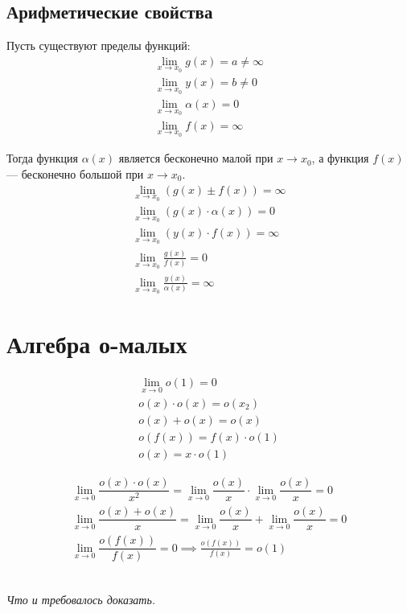 \documentclass[a4paper,12pt,oneside]{extbook}
\newcommand{\newpar}{$ $\par\nobreak\ignorespaces}
\theoremstyle{numbered}
\theoremstyle{unnumbered}
\theoremstyle{named}
\theoremstyle{unnumbered}
\theoremstyle{named}
\theoremstyle{named}
\theoremstyle{named}
\renewenvironment{proof}[1][]{\breakenv[Доказательство]{\if\relax\detokenize{#1}\relax\else\;\fi}{\textbf{#1}}}{\smallskip\newpar \hfill\textit{Что и требовалось доказать.}}
\begin{document}
\subsection{Арифметические свойства}%
\label{sub:Арифметические свойства}

Пусть существуют пределы функций:
\begin{gather*}
    \lim_{x \to x_0}{g(x)} = a \neq \infty \\
    \lim_{x \to x_0}{y(x)} = b \neq 0 \\
    \lim_{x \to x_0}{\alpha(x)} = 0 \\
    \lim_{x \to x_0}{f(x)} = \infty
\end{gather*}

Тогда функция \(\alpha(x)\) является бесконечно малой при \(x \to x_0\), а функция \(f(x)\) — бесконечно большой при \(x \to x_0\).
\begin{gather*}
    \lim_{x \to x_0}{(g(x) \pm f(x))} = \infty \\
    \lim_{x \to x_0}{(g(x) \cdot \alpha(x))} = 0 \\
    \lim_{x \to x_0}{(y(x) \cdot f(x))} = \infty \\
    \lim_{x \to x_0}{\frac{g(x)}{f(x)}} = 0 \\
    \lim_{x \to x_0}{\frac{y(x)}{\alpha(x)}} = \infty
\end{gather*}

\section{Алгебра о-малых}%
\label{sec:Алгебра о-малых}

\begin{gather*}
    \lim_{x \to 0}{o(1)} = 0 \\
    o(x) \cdot o(x) = o(x_2) \\
    o(x) + o(x) = o(x) \\
    o(f(x)) = f(x) \cdot o(1) \\
    o(x) = x \cdot o(1)
\end{gather*}

\begin{proof}
    \begin{gather*}
        \lim_{x \to 0}{\dfrac{o(x) \cdot o(x)}{x^2}} = \lim_{x \to 0}{\dfrac{o(x)}{x}} \cdot \lim_{x \to 0}{\dfrac{o(x)}{x}} = 0 \\
        \lim_{x \to 0}{\dfrac{o(x) + o(x)}{x}} = \lim_{x \to 0}{\dfrac{o(x)}{x}} + \lim_{x \to 0}{\dfrac{o(x)}{x}} = 0 \\
        \lim_{x \to 0}{\dfrac{o(f(x))}{f(x)}} = 0 \implies \frac{o(f(x))}{f(x)} = o(1)
    \end{gather*}
\end{proof}
\end{document}
